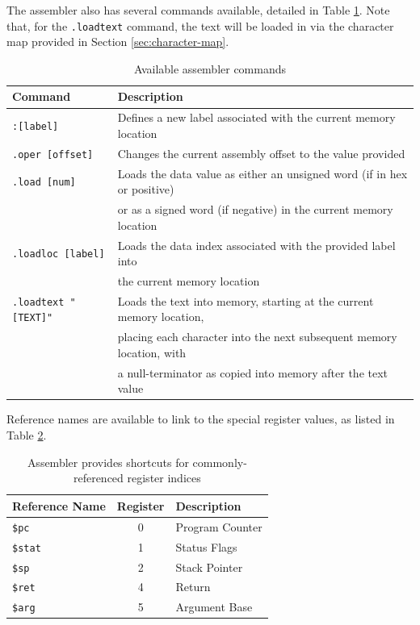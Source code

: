 \documentclass{article}
\begin{document}
\pagebreak

The assembler also has several commands available, detailed in Table \ref{table:assembler-commands}. Note that, for the \texttt{.loadtext} command, the text will be loaded in via the character map provided in Section \ref{sec:character-map}.

\begin{table}[h!]
    \centering
    \begin{tabular}{l|l}
        \hline
        Command & Description \\
        \hline
        \texttt{:[label]} & Defines a new label associated with the current memory location \\
        \texttt{.oper [offset]} & Changes the current assembly offset to the value provided \\
        \texttt{.load [num]} & Loads the data value as either an unsigned word (if in hex or positive)\\
        & or as a signed word (if negative) in the current memory location \\
        \texttt{.loadloc [label]} & Loads the data index associated with the provided label into \\
        & the current memory location \\
        \texttt{.loadtext "[TEXT]"} & Loads the text into memory, starting at the current memory location, \\
        & placing each character into the next subsequent memory location, with \\
        & a null-terminator as copied into memory after the text value \\
        \hline
    \end{tabular}
    \caption{Available assembler commands}
    \label{table:assembler-commands}
\end{table}

Reference names are available to link to the special register values, as listed in Table \ref{table:assembler-register-references}.

\begin{table}[h!]
    \centering
    \begin{tabular}{l|cl}
        \hline
        Reference Name & Register & Description \\
        \hline
        \texttt{\$pc} & 0 & Program Counter \\
        \texttt{\$stat} & 1 & Status Flags \\
        \texttt{\$sp} & 2 & Stack Pointer \\
        \texttt{\$ret} & 4 & Return \\
        \texttt{\$arg} & 5 & Argument Base \\
        \hline
    \end{tabular}
    \caption{Assembler provides shortcuts for commonly-referenced register indices}
    \label{table:assembler-register-references}
\end{table}
\end{document}
